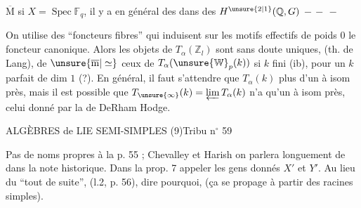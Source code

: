 

$\overline{\mathrm M}$ si $X=\operatorname{Spec}\mathbb F_q$, il y a en général
des \deleted{$\unsure{\xi}$}   dans
des $H^{\unsure{2|1}}(\mathbb Q,G)$ $-\, -\, -$

\margin{$\unsure{\ast}$}
On utilise des ``foncteurs fibres'' qui induisent sur
les motifs effectifs de poids $0$ le foncteur
canonique. Alors les objets de $T_\alpha(\mathbb Z_l)$ sont
sans doute uniques, (th. de Lang), de $\unsure{\overline{\mathrm m}|\simeq}$
ceux de $T_\alpha(\unsure{\mathbb W}_p(k))$ si $k$ fini (ib),  pour un
$k$ parfait de dim  $1$ (?). En général, il
faut s'attendre que $T_\alpha(k)$  plus d'un
 à isom près, mais il est possible
que $T_{\unsure{\infty}}(k)=\varprojlim T_\alpha(k)$ n'a qu'un  à
isom près, celui donné par la  de DeRham
Hodge.



ALGÈBRES de LIE SEMI-SIMPLES (9)\hfill Tribu n$^\circ$ 59

Pas de noms propres à la p. 55 ; Chevalley et Harish on parlera longuement
de dans la note historique. Dans la prop. 7 appeler les gens donnés $X'$ et $Y'$.
Au lieu du ``tout de suite'', (l.2, p. 56), dire pourquoi, (ça se propage à partir
des racines simples).

